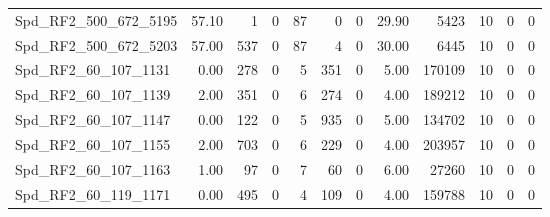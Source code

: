 \begin{longtable}[c]{@{}lrrrrrrrrrrr@{}}
Spd\_RF2\_500\_672\_5195     & 57.10                  & 1                       & 0                       & 87                     & 0                       & 0                       & 29.90                   & 5423                     & 10                       & 0                        & 0                        \\
Spd\_RF2\_500\_672\_5203     & 57.00                  & 537                     & 0                       & 87                     & 4                       & 0                       & 30.00                   & 6445                     & 10                       & 0                        & 0                        \\
Spd\_RF2\_60\_107\_1131      & 0.00                   & 278                     & 0                       & 5                      & 351                     & 0                       & 5.00                    & 170109                   & 10                       & 0                        & 0                        \\
Spd\_RF2\_60\_107\_1139      & 2.00                   & 351                     & 0                       & 6                      & 274                     & 0                       & 4.00                    & 189212                   & 10                       & 0                        & 0                        \\
Spd\_RF2\_60\_107\_1147      & 0.00                   & 122                     & 0                       & 5                      & 935                     & 0                       & 5.00                    & 134702                   & 10                       & 0                        & 0                        \\
Spd\_RF2\_60\_107\_1155      & 2.00                   & 703                     & 0                       & 6                      & 229                     & 0                       & 4.00                    & 203957                   & 10                       & 0                        & 0                        \\
Spd\_RF2\_60\_107\_1163      & 1.00                   & 97                      & 0                       & 7                      & 60                      & 0                       & 6.00                    & 27260                    & 10                       & 0                        & 0                        \\
Spd\_RF2\_60\_119\_1171      & 0.00                   & 495                     & 0                       & 4                      & 109                     & 0                       & 4.00                    & 159788                   & 10                       & 0                        & 0                        \\

\end{longtable}
